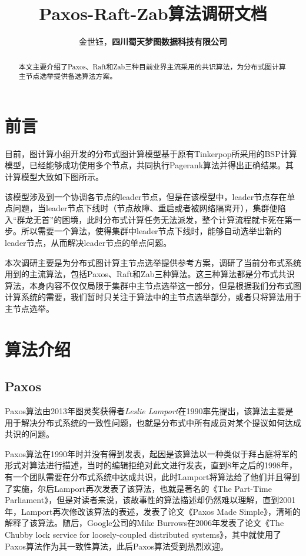 \documentclass{article}
\title{Paxos-Raft-Zab算法调研文档}
\author{金世钰，\textbf{四川蜀天梦图数据科技有限公司}}
\begin{document}
\maketitle

\begin{abstract}
本文主要介绍了Paxos、Raft和Zab三种目前业界主流采用的共识算法，为分布式图计算主节点选举提供备选算法方案。
\end{abstract}

\section{前言}
目前，图计算小组开发的分布式图计算模型基于原有Tinkerpop所采用的BSP计算模型，已经能够成功使用多个节点，共同执行Pagerank算法并得出正确结果。其计算模型大致如下图所示。



该模型涉及到一个协调各节点的leader节点，但是在该模型中，leader节点存在单点问题，当leader节点下线时（节点故障、重启或者被网络隔离开），集群便陷入“群龙无首”的困境，此时分布式计算任务无法派发，整个计算流程就卡死在第一步。所以需要一个算法，使得集群中leader节点下线时，能够自动选举出新的leader节点，从而解决leader节点的单点问题。

本次调研主要是为分布式图计算主节点选举提供参考方案，调研了当前分布式系统用到的主流算法，包括Paxos、Raft和Zab三种算法。这三种算法都是分布式共识算法，本身内容不仅仅局限于集群中主节点选举这一部分，但是根据我们分布式图计算系统的需要，我们暂时只关注于算法中的主节点选举部分，或者只将算法用于主节点选举。 

\section{算法介绍}

\subsection{Paxos}
Paxos算法由2013年图灵奖获得者\emph{Leslie Lamport}在1990率先提出，该算法主要是用于解决分布式系统的一致性问题，也就是分布式中所有成员对某个提议如何达成共识的问题。

Paxos算法在1990年时并没有得到发表，起因是该算法以一种类似于拜占庭将军的形式对算法进行描述，当时的编辑拒绝对此文进行发表，直到8年之后的1998年，有一个团队需要在分布式系统中达成共识，此时Lamport将算法给了他们并且得到了实施，尔后Lamport再次发表了该算法，也就是著名的《The Part-Time Parliament》，但是对读者来说，该故事性的算法描述却仍然难以理解，直到2001年，Lamport再次修改该算法的表述，发表了论文《Paxos Made Simple》，清晰的解释了该算法。随后，Google公司的Mike Burrows在2006年发表了论文《The Chubby lock service for loosely-coupled distributed systems》，其中就使用了Paxos算法作为其一致性算法，此后Paxos算法受到热烈欢迎。
\end{document}
